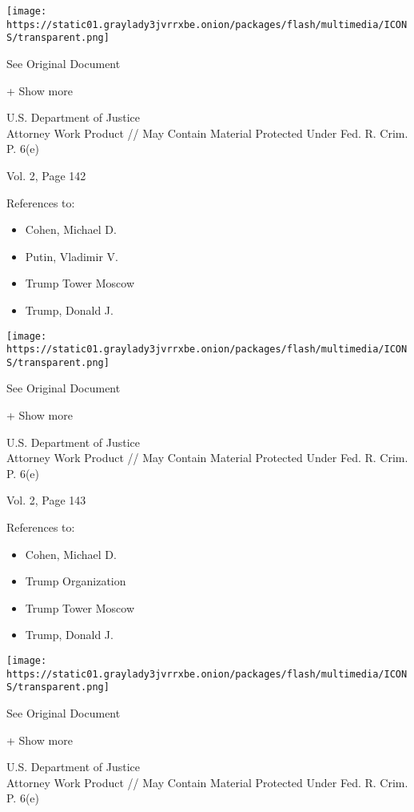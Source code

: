 \protect\hyperlink{}{}

\texttt{[image: https://static01.graylady3jvrrxbe.onion/packages/flash/multimedia/ICONS/transparent.png]}

See Original Document

+ Show more

U.S. Department of Justice\\
Attorney Work Product // May Contain Material Protected Under Fed. R.
Crim. P. 6(e)

Vol. 2, Page 142

References to:

\begin{itemize}
\tightlist
\item
  Cohen, Michael D.
\item
  Putin, Vladimir V.
\item
  Trump Tower Moscow
\item
  Trump, Donald J.
\end{itemize}

\protect\hyperlink{}{}

\texttt{[image: https://static01.graylady3jvrrxbe.onion/packages/flash/multimedia/ICONS/transparent.png]}

See Original Document

+ Show more

U.S. Department of Justice\\
Attorney Work Product // May Contain Material Protected Under Fed. R.
Crim. P. 6(e)

Vol. 2, Page 143

References to:

\begin{itemize}
\tightlist
\item
  Cohen, Michael D.
\item
  Trump Organization
\item
  Trump Tower Moscow
\item
  Trump, Donald J.
\end{itemize}

\protect\hyperlink{}{}

\texttt{[image: https://static01.graylady3jvrrxbe.onion/packages/flash/multimedia/ICONS/transparent.png]}

See Original Document

+ Show more

U.S. Department of Justice\\
Attorney Work Product // May Contain Material Protected Under Fed. R.
Crim. P. 6(e)

